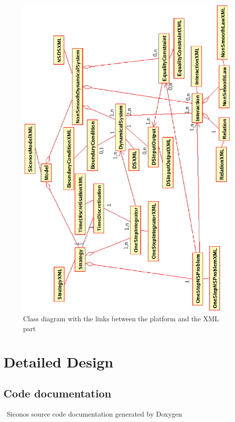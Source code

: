 	\begin{figure}
	\begin{center}
	\includegraphics[scale=1.2, clip]{figure/platform.eps}
	\caption{Class diagram with the links between the platform and the XML part}
	\label{fig: Class diagram with the links between the platform and the XML part}
	\end{center}
	\end{figure}


\section{Detailed Design}
\subsection{Code documentation}
\cf~Siconos source code documentation generated by Doxygen

